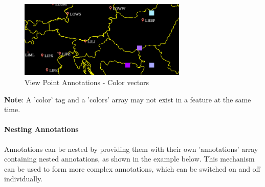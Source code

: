 \begin{figure}[H]
    \center
        \includegraphics[width=8cm]{figures/viewpoints_anno_example_colorvec.png}
    \caption{View Point Annotations - Color vectors} 
\end{figure}

\textbf{Note}: A 'color' tag and a 'colors' array may not exist in a feature at the same time.

\paragraph{Nesting Annotations} Annotations can be nested by providing them with their own 'annotations' array containing nested 
annotations, as shown in the example below. This mechanism can be used to form more complex annotations, which can be switched on and off 
individually.

